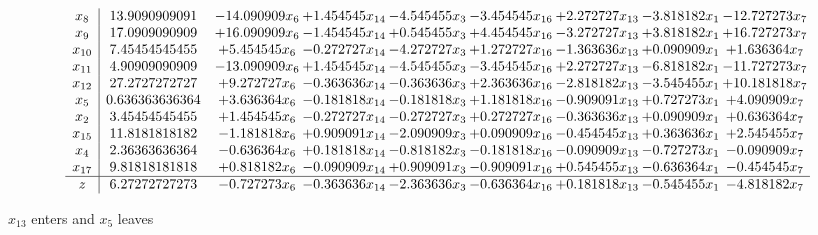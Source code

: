 \documentclass[10pt]{article}
\begin{document}
 \[\begin{array}{c| c c@{\hskip 2pt} c@{\hskip 2pt} c@{\hskip 2pt} c@{\hskip 2pt} c@{\hskip 2pt} c@{\hskip 2pt} c@{\hskip 2pt} }
 x_{8}   &  13.9090909091 & -14.090909 x_{6} & + 1.454545 x_{14} & -4.545455 x_{3} & -3.454545 x_{16} & + 2.272727 x_{13} & -3.818182 x_{1} & -12.727273 x_{7}\\
 x_{9}   &  17.0909090909 & + 16.090909 x_{6} & -1.454545 x_{14} & + 0.545455 x_{3} & + 4.454545 x_{16} & -3.272727 x_{13} & + 3.818182 x_{1} & + 16.727273 x_{7}\\
 x_{10}   &  7.45454545455 & + 5.454545 x_{6} & -0.272727 x_{14} & -4.272727 x_{3} & + 1.272727 x_{16} & -1.363636 x_{13} & + 0.090909 x_{1} & + 1.636364 x_{7}\\
 x_{11}   &  4.90909090909 & -13.090909 x_{6} & + 1.454545 x_{14} & -4.545455 x_{3} & -3.454545 x_{16} & + 2.272727 x_{13} & -6.818182 x_{1} & -11.727273 x_{7}\\
 x_{12}   &  27.2727272727 & + 9.272727 x_{6} & -0.363636 x_{14} & -0.363636 x_{3} & + 2.363636 x_{16} & -2.818182 x_{13} & -3.545455 x_{1} & + 10.181818 x_{7}\\
 x_{5}   &  0.636363636364 & + 3.636364 x_{6} & -0.181818 x_{14} & -0.181818 x_{3} & + 1.181818 x_{16} & -0.909091 x_{13} & + 0.727273 x_{1} & + 4.090909 x_{7}\\
 x_{2}   &  3.45454545455 & + 1.454545 x_{6} & -0.272727 x_{14} & -0.272727 x_{3} & + 0.272727 x_{16} & -0.363636 x_{13} & + 0.090909 x_{1} & + 0.636364 x_{7}\\
 x_{15}   &  11.8181818182 & -1.181818 x_{6} & + 0.909091 x_{14} & -2.090909 x_{3} & + 0.090909 x_{16} & -0.454545 x_{13} & + 0.363636 x_{1} & + 2.545455 x_{7}\\
 x_{4}   &  2.36363636364 & -0.636364 x_{6} & + 0.181818 x_{14} & -0.818182 x_{3} & -0.181818 x_{16} & -0.090909 x_{13} & -0.727273 x_{1} & -0.090909 x_{7}\\
 x_{17}   &  9.81818181818 & + 0.818182 x_{6} & -0.090909 x_{14} & + 0.909091 x_{3} & -0.909091 x_{16} & + 0.545455 x_{13} & -0.636364 x_{1} & -0.454545 x_{7}\\
\hline
z    &  6.27272727273 & -0.727273 x_{6} & -0.363636 x_{14} & -2.363636 x_{3} & -0.636364 x_{16} & + 0.181818 x_{13} & -0.545455 x_{1} & -4.818182 x_{7}\\
\end{array}\]


 $ x_{13} $ enters and $ x_{5} $ leaves 
\end{document}
